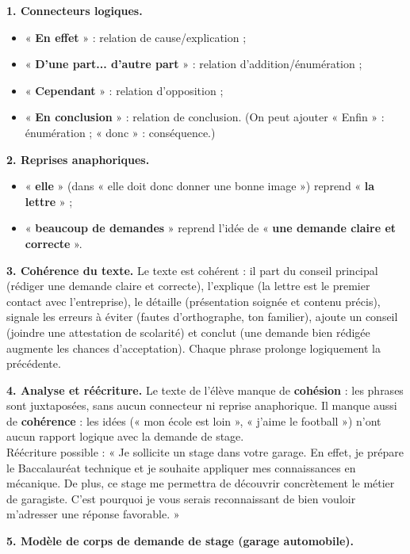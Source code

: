 \documentclass[11pt]{article}
\begin{document}
\begin{corrige}
\textbf{1. Connecteurs logiques.}
\begin{itemize}
\item « \textbf{En effet} » : relation de cause/explication ;
\item « \textbf{D'une part... d'autre part} » : relation d'addition/énumération ;
\item « \textbf{Cependant} » : relation d'opposition ;
\item « \textbf{En conclusion} » : relation de conclusion. (On peut ajouter « Enfin » : énumération ; « donc » : conséquence.)
\end{itemize}

\textbf{2. Reprises anaphoriques.}
\begin{itemize}
\item « \textbf{elle} » (dans « elle doit donc donner une bonne image ») reprend « \textbf{la lettre} » ;
\item « \textbf{beaucoup de demandes} » reprend l'idée de « \textbf{une demande claire et correcte} ».
\end{itemize}

\textbf{3. Cohérence du texte.} Le texte est cohérent : il part du conseil principal (rédiger une demande claire et correcte), l'explique (la lettre est le premier contact avec l'entreprise), le détaille (présentation soignée et contenu précis), signale les erreurs à éviter (fautes d'orthographe, ton familier), ajoute un conseil (joindre une attestation de scolarité) et conclut (une demande bien rédigée augmente les chances d'acceptation). Chaque phrase prolonge logiquement la précédente.

\textbf{4. Analyse et réécriture.} Le texte de l'élève manque de \textbf{cohésion} : les phrases sont juxtaposées, sans aucun connecteur ni reprise anaphorique. Il manque aussi de \textbf{cohérence} : les idées (« mon école est loin », « j'aime le football ») n'ont aucun rapport logique avec la demande de stage.\\
Réécriture possible : « Je sollicite un stage dans votre garage. En effet, je prépare le Baccalauréat technique et je souhaite appliquer mes connaissances en mécanique. De plus, ce stage me permettra de découvrir concrètement le métier de garagiste. C'est pourquoi je vous serais reconnaissant de bien vouloir m'adresser une réponse favorable. »

\textbf{5. Modèle de corps de demande de stage (garage automobile).}


\end{corrige}
\end{document}
